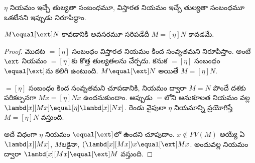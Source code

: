 \documentclass[../../../include/open-logic-section]{subfiles}
\begin{document}
$\eta$ నియమం ఇచ్చే తుల్యతా సంబంధమూ, విస్తారత నియమం ఇచ్చే తుల్యతా సంబంధమూ
ఒకటేనని ఇప్పుడు నిరూపిద్దాం.

\begin{thm}
  $M \equal[\ext] N$ కావడానికి అవసరమూ సరిపడేదీ
  $M \equal[\eta] N$ కావడమే.
\end{thm}

\begin{proof}
  మొదట $\equal[\eta]$ సంబంధం విస్తారత నియమం కింద
  సంవృతమని నిరూపిస్తాం. అంటే $\ext$ నియమం
  $\equal[\eta]$కు కొత్త తుల్యతలను చేర్చదు. కనుక
  $\equal[\eta]$ సంబంధం $\equal[\ext]$ను కలిగి ఉంటుంది.
  $M \equal[\ext] N$ అయితే $M \equal[\eta] N$.

  $\equal[\eta]$ సంబంధం \ext{} కింద సంవృతమని
  చూపడానికి, \ext{} నియమం ద్వారా $M \equal N$ పొందే
  దశకు పరికల్పనగా $Mx \equal[\eta] Nx$ ఉందనుకుందాం.
  అప్పుడు
  $\equal$లోని అనుకూలత నియమం వల్ల $\lambd[x][Mx]
  \equal[\eta] \lambd[x][Nx]$. రెండు వైపులా $\eta$
  నియమాన్ని ప్రయోగిస్తే $M \equal[\eta] N$ వస్తుంది.

  అదే విధంగా $\eta$ నియమం $\equal[\ext]$లో ఉందని
  చూపుదాం. $x \notin FV(M)$ అయ్యే ఏ
  $\lambd[x][Mx]$, $M$లకైనా, $(\lambd[x][Mx])x
  \equal[\ext] Mx$. అందువల్ల \ext{} నియమం ద్వారా
  $\lambd[x][Mx] \equal[\ext] M$ వస్తుంది.
\end{proof}
\end{document}
